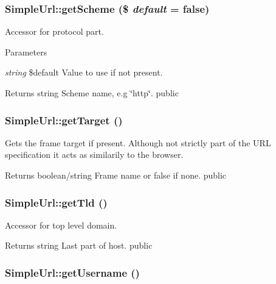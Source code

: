 \hypertarget{class_simple_url_a567de036cb25671ade4c14489ed0f8a9}{
\subsubsection[{getScheme}]{\setlength{\rightskip}{0pt plus 5cm}SimpleUrl::getScheme (\$ {\em default} = {\ttfamily false})}}
\label{class_simple_url_a567de036cb25671ade4c14489ed0f8a9}
Accessor for protocol part. 
\begin{DoxyParams}{Parameters}
\item[{\em string}]\$default Value to use if not present. \end{DoxyParams}
\begin{DoxyReturn}{Returns}
string Scheme name, e.g \char`\"{}http\char`\"{}.  public 
\end{DoxyReturn}
\hypertarget{class_simple_url_a2d27d22fc50bcdb12adcbaaa87a988a4}{
\subsubsection[{getTarget}]{\setlength{\rightskip}{0pt plus 5cm}SimpleUrl::getTarget ()}}
\label{class_simple_url_a2d27d22fc50bcdb12adcbaaa87a988a4}
Gets the frame target if present. Although not strictly part of the URL specification it acts as similarily to the browser. \begin{DoxyReturn}{Returns}
boolean/string Frame name or false if none.  public 
\end{DoxyReturn}
\hypertarget{class_simple_url_aff07635b90f4833decc7f52a8c808825}{
\subsubsection[{getTld}]{\setlength{\rightskip}{0pt plus 5cm}SimpleUrl::getTld ()}}
\label{class_simple_url_aff07635b90f4833decc7f52a8c808825}
Accessor for top level domain. \begin{DoxyReturn}{Returns}
string Last part of host.  public 
\end{DoxyReturn}
\hypertarget{class_simple_url_a23df1af0d73592a0077891311c557e32}{
\subsubsection[{getUsername}]{\setlength{\rightskip}{0pt plus 5cm}SimpleUrl::getUsername ()}}
